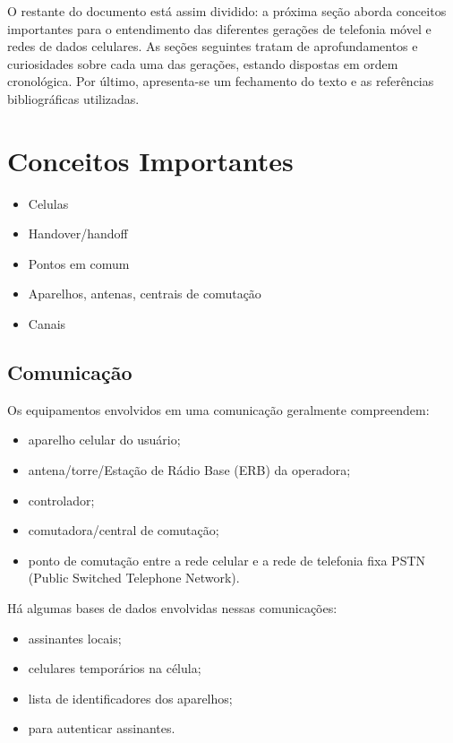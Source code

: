 \documentclass[11pt,oneside,a4paper]{abntex2}
\begin{document}
O restante do documento está assim dividido: a próxima seção aborda conceitos importantes para o entendimento das diferentes gerações de telefonia móvel e redes de dados celulares. As seções seguintes tratam de aprofundamentos e curiosidades sobre cada uma das gerações, estando dispostas em ordem cronológica. Por último, apresenta-se um fechamento do texto e as referências bibliográficas utilizadas.

\section*{Conceitos Importantes}
\label{conceitos}

\begin{itemize}
	\item Celulas
	\item Handover/handoff
	\item Pontos em comum
	\item Aparelhos, antenas, centrais de comutação
	\item Canais
\end{itemize}

\subsection*{Comunicação}

Os equipamentos envolvidos em uma comunicação geralmente compreendem:
\begin{itemize}
	\item aparelho celular do usuário;
	\item antena/torre/Estação de Rádio Base (ERB) da operadora;
	\item controlador;
	\item comutadora/central de comutação;
	\item ponto de comutação entre a rede celular e a rede de telefonia fixa PSTN (Public Switched Telephone Network).
\end{itemize}

Há algumas bases de dados envolvidas nessas comunicações:
\begin{itemize}
	\item assinantes locais;
	\item celulares temporários na célula;
	\item lista de identificadores dos aparelhos;
	\item para autenticar assinantes.
\end{itemize}
\end{document}
